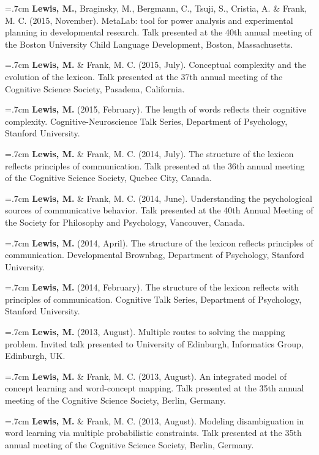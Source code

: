 \documentclass[letterpaper]{article}
\begin{document}
\hangindent=.7cm {\bf Lewis, M.},  Braginsky,  M.,  Bergmann, C., Tsuji, S., Cristia, A. \& Frank, M. C. (2015, November). MetaLab: tool for power analysis and experimental planning in developmental research. Talk presented at the 40th annual meeting of the Boston University Child Language Development, Boston, Massachusetts.

\hangindent=.7cm {\bf Lewis, M.} \& Frank, M. C. (2015, July). Conceptual complexity and the evolution of the lexicon. Talk presented at the 37th annual meeting of the Cognitive Science Society, Pasadena, California.

\hangindent=.7cm {\bf Lewis, M.}  (2015, February). The length of words reflects their cognitive complexity. Cognitive-Neuroscience Talk Series, Department of Psychology, Stanford University.

\hangindent=.7cm {\bf Lewis, M.} \& Frank, M. C. (2014, July). The structure of the lexicon reflects  principles of communication. Talk presented at the 36th annual meeting of the Cognitive Science Society, Quebec City, Canada.

\hangindent=.7cm {\bf Lewis, M.} \& Frank, M. C. (2014, June). Understanding the psychological sources of communicative behavior. Talk presented at the 40th Annual Meeting of the Society for Philosophy and Psychology, Vancouver, Canada.

\hangindent=.7cm {\bf Lewis, M.} (2014, April). The structure of the lexicon reflects principles of communication. Developmental Brownbag, Department of Psychology, Stanford University.

\hangindent=.7cm {\bf Lewis, M.} (2014, February). The structure of the lexicon reflects with principles of communication. Cognitive Talk Series, Department of Psychology, Stanford University.

 \hangindent=.7cm {\bf Lewis, M.} (2013, August). Multiple routes to solving the mapping problem. Invited talk presented to University of Edinburgh, Informatics Group,  Edinburgh, UK.

 \hangindent=.7cm {\bf Lewis, M.}  \& Frank, M. C. (2013, August). An integrated model of concept learning and word-concept mapping. Talk presented at the 35th annual meeting of the Cognitive Science Society, Berlin, Germany.
 
 \hangindent=.7cm {\bf Lewis, M.}  \& Frank, M. C.  (2013, August). Modeling disambiguation in word learning via multiple probabilistic constraints. Talk presented at the 35th annual meeting of the Cognitive Science Society, Berlin, Germany.
 
\end{document}
